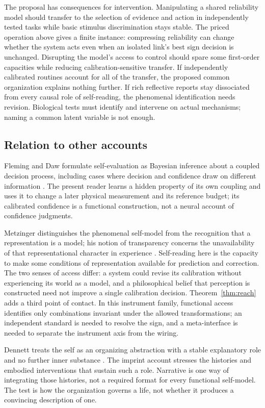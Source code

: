 \documentclass[11pt,a4paper]{article}
\begin{document}
The proposal has consequences for intervention. Manipulating a shared reliability model should transfer to the selection of evidence and action in independently tested tasks while basic stimulus discrimination stays stable. The priced operation above gives a finite instance: compressing reliability can change whether the system acts even when an isolated link's best sign decision is unchanged. Disrupting the model's access to control should spare some first-order capacities while reducing calibration-sensitive transfer. If independently calibrated routines account for all of the transfer, the proposed common organization explains nothing further. If rich reflective reports stay dissociated from every causal role of self-reading, the phenomenal identification needs revision. Biological tests must identify and intervene on actual mechanisms; naming a common latent variable is not enough.

\subsection{Relation to other accounts}

Fleming and Daw formulate self-evaluation as Bayesian inference about a coupled decision process, including cases where decision and confidence draw on different information \cite{FlemingDaw2017}. The present reader learns a hidden property of its own coupling and uses it to change a later physical measurement and its reference budget; its calibrated confidence is a functional construction, not a neural account of confidence judgments.

Metzinger distinguishes the phenomenal self-model from the recognition that a representation is a model; his notion of transparency concerns the unavailability of that representational character in experience \cite{Metzinger2005}. Self-reading here is the capacity to make some conditions of representation available for prediction and correction. The two senses of access differ: a system could revise its calibration without experiencing its world as a model, and a philosophical belief that perception is constructed need not improve a single calibration decision. Theorem~\ref{thm:reach} adds a third point of contact. In this instrument family, functional access identifies only combinations invariant under the allowed transformations; an independent standard is needed to resolve the sign, and a meta-interface is needed to separate the instrument axis from the wiring.

Dennett treats the self as an organizing abstraction with a stable explanatory role and no further inner substance \cite{Dennett1992}. The imprint account stresses the histories and embodied interventions that sustain such a role. Narrative is one way of integrating those histories, not a required format for every functional self-model. The test is how the organization governs a life, not whether it produces a convincing description of one.
\end{document}
